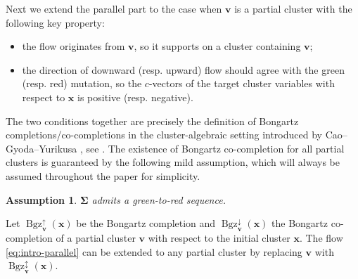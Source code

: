 \documentclass[11pt,reqno]{amsart}
\theoremstyle{plain}
\newtheorem{assumption}[theorem]{Assumption}
\theoremstyle{definition}
\numberwithin{equation}{section}
\newcommand\<{\langle}
\renewcommand\>{\rangle}
\newcommand{\on}[1]{\operatorname{#1}}
\def\vv{\mathbf{v}}
\def\sink{X}
\newcommand{\flowd}[1]{\on{evo}^{#1}_{\downarrow}}
\newcommand{\flowu}[1]{\on{evo}^{#1}_{\uparrow}}
\newcommand{\ccpt}[1]{\mathrm{#1}}%
\def\xevo{\ccpt{X}}%
\newcommand{\bfit}[1]{\textbf{\textit{#1}}}
\def\seeds{\mathbf{\Sigma}}
\def\xx{\mathbf{x}}%
\def\gvec{\bfit{g}}
\newcommand{\Bgzp}[2]{\operatorname{Bgz}^{\uparrow}_{#2}(#1)}
\newcommand{\Bgzm}[2]{\operatorname{Bgz}^{\downarrow}_{#2}(#1)}
\newcommand{\Bgzpm}[2]{\operatorname{Bgz}^{\updownarrow}_{#2}(#1)}
\newcommand{\ol}[1]{\overline{#1}}
\def\normal{\on{N}}
\def\tgvec{\widetilde{\gvec}}
\begin{document}
Next we extend the parallel part to the case when $\vv$ is a partial cluster with the following key property:
\begin{itemize}
    \item the flow originates from $\vv$, so it supports on a cluster containing $\vv$;
    \item the direction of downward (resp. upward) flow should agree with the green (resp. red) mutation, so the $c$-vectors of the target cluster variables with respect to $\xx$ is positive (resp. negative).
\end{itemize}
The two conditions together are precisely the definition of Bongartz completions/co-completions in the cluster-algebraic setting introduced by Cao--Gyoda--Yurikusa \cite{CGY}, see . 
The existence of Bongartz co-completion for all partial clusters is guaranteed by the following mild assumption, which will always be assumed throughout the paper for simplicity.
\begin{assumption}\label{ass0}
    $\seeds$ {admits a green-to-red sequence}. 
\end{assumption}
Let $\Bgzp{\xx}{\vv}$ be the Bongartz completion and $\Bgzm{\xx}{\vv}$ the Bongartz co-completion of a partial cluster $\vv$ with respect to the initial cluster ${\xx}$. 
The flow \eqref{eq:intro-parallel} can be extended to any partial cluster by replacing $\vv$ with $\Bgzpm{\xx}{\vv}$.
\end{document}
